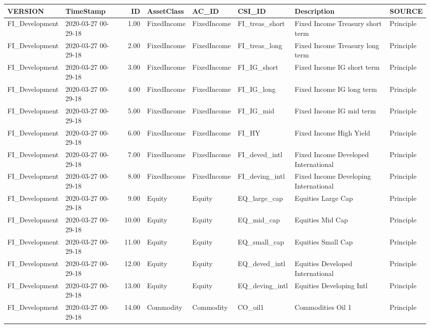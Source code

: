 \begin{longtable}{llrlllll}
  \hline
VERSION & TimeStamp & ID & AssetClass & AC\_ID & CSI\_ID & Description & SOURCE \\ 
  \hline
FI\_Development & 2020-03-27 00-29-18 & 1.00 & FixedIncome & FixedIncome & FI\_treas\_short & Fixed Income Treasury short term & Principle \\ 
  FI\_Development & 2020-03-27 00-29-18 & 2.00 & FixedIncome & FixedIncome & FI\_treas\_long & Fixed Income Treasury long term & Principle \\ 
  FI\_Development & 2020-03-27 00-29-18 & 3.00 & FixedIncome & FixedIncome & FI\_IG\_short & Fixed Income IG short term & Principle \\ 
  FI\_Development & 2020-03-27 00-29-18 & 4.00 & FixedIncome & FixedIncome & FI\_IG\_long & Fixed Income IG long term & Principle \\ 
  FI\_Development & 2020-03-27 00-29-18 & 5.00 & FixedIncome & FixedIncome & FI\_IG\_mid & Fixed Income IG mid term & Principle \\ 
  FI\_Development & 2020-03-27 00-29-18 & 6.00 & FixedIncome & FixedIncome & FI\_HY & Fixed Income High Yield & Principle \\ 
  FI\_Development & 2020-03-27 00-29-18 & 7.00 & FixedIncome & FixedIncome & FI\_deved\_intl & Fixed Income Developed International & Principle \\ 
  FI\_Development & 2020-03-27 00-29-18 & 8.00 & FixedIncome & FixedIncome & FI\_deving\_intl & Fixed Income Developing International & Principle \\ 
  FI\_Development & 2020-03-27 00-29-18 & 9.00 & Equity & Equity & EQ\_large\_cap & Equities Large Cap & Principle \\ 
  FI\_Development & 2020-03-27 00-29-18 & 10.00 & Equity & Equity & EQ\_mid\_cap & Equities Mid Cap & Principle \\ 
  FI\_Development & 2020-03-27 00-29-18 & 11.00 & Equity & Equity & EQ\_small\_cap & Equities Small Cap & Principle \\ 
  FI\_Development & 2020-03-27 00-29-18 & 12.00 & Equity & Equity & EQ\_deved\_intl & Equities Developed International & Principle \\ 
  FI\_Development & 2020-03-27 00-29-18 & 13.00 & Equity & Equity & EQ\_deving\_intl & Equities Developing Intl & Principle \\ 
  FI\_Development & 2020-03-27 00-29-18 & 14.00 & Commodity & Commodity & CO\_oil1 & Commodities Oil 1 & Principle \\ 

\end{longtable}
